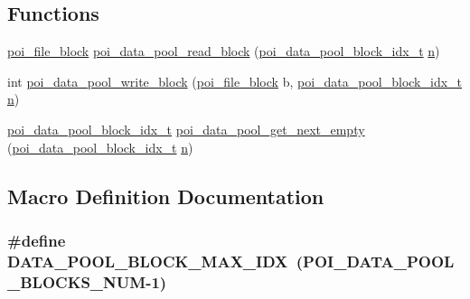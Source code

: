 \subsection*{Functions}
\begin{DoxyCompactItemize}
\item 
\hyperlink{structpoi__file__block}{poi\-\_\-file\-\_\-block} \hyperlink{data-pool-block-manager_8h_ac930ae4a4b3ca65a49d45c7654f15149}{poi\-\_\-data\-\_\-pool\-\_\-read\-\_\-block} (\hyperlink{data-pool-block-manager_8h_a87e19ab8290bcd76be1c7db1e90cc6f6}{poi\-\_\-data\-\_\-pool\-\_\-block\-\_\-idx\-\_\-t} \hyperlink{allocation-table-test_8c_a24010dade8ebab3f87a48022772cd975}{n})
\item 
int \hyperlink{data-pool-block-manager_8h_a10624f1cbc61dd0a8a03aa94d8502567}{poi\-\_\-data\-\_\-pool\-\_\-write\-\_\-block} (\hyperlink{structpoi__file__block}{poi\-\_\-file\-\_\-block} b, \hyperlink{data-pool-block-manager_8h_a87e19ab8290bcd76be1c7db1e90cc6f6}{poi\-\_\-data\-\_\-pool\-\_\-block\-\_\-idx\-\_\-t} \hyperlink{allocation-table-test_8c_a24010dade8ebab3f87a48022772cd975}{n})
\item 
\hyperlink{data-pool-block-manager_8h_a87e19ab8290bcd76be1c7db1e90cc6f6}{poi\-\_\-data\-\_\-pool\-\_\-block\-\_\-idx\-\_\-t} \hyperlink{data-pool-block-manager_8h_ae02f040d4e0f458f0d63751bc09f55b7}{poi\-\_\-data\-\_\-pool\-\_\-get\-\_\-next\-\_\-empty} (\hyperlink{data-pool-block-manager_8h_a87e19ab8290bcd76be1c7db1e90cc6f6}{poi\-\_\-data\-\_\-pool\-\_\-block\-\_\-idx\-\_\-t} \hyperlink{allocation-table-test_8c_a24010dade8ebab3f87a48022772cd975}{n})
\end{DoxyCompactItemize}


\subsection{Macro Definition Documentation}
\hypertarget{data-pool-block-manager_8h_a7d56b75785e6fcf7a7e48cf1e0597fce}{
\subsubsection[{D\-A\-T\-A\-\_\-\-P\-O\-O\-L\-\_\-\-B\-L\-O\-C\-K\-\_\-\-M\-A\-X\-\_\-\-I\-D\-X}]{\setlength{\rightskip}{0pt plus 5cm}\#define D\-A\-T\-A\-\_\-\-P\-O\-O\-L\-\_\-\-B\-L\-O\-C\-K\-\_\-\-M\-A\-X\-\_\-\-I\-D\-X~({\bf P\-O\-I\-\_\-\-D\-A\-T\-A\-\_\-\-P\-O\-O\-L\-\_\-\-B\-L\-O\-C\-K\-S\-\_\-\-N\-U\-M}-\/1)}}\label{data-pool-block-manager_8h_a7d56b75785e6fcf7a7e48cf1e0597fce}


